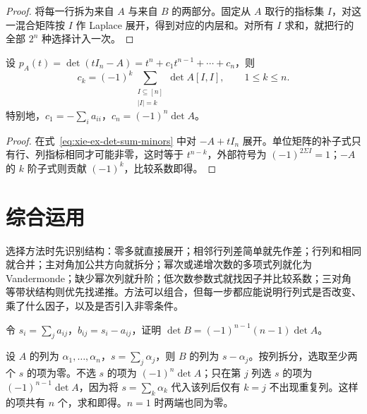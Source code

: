 \begin{proof}
将每一行拆为来自 $A$ 与来自 $B$ 的两部分。固定从 $A$ 取行的指标集 $I$，对这一混合矩阵按 $I$ 作 Laplace 展开，得到对应的内层和。对所有 $I$ 求和，就把行的全部 $2^n$ 种选择计入一次。
\end{proof}

\begin{corollary}[特征多项式的系数]
\label{cor:xie-ex-det-characteristic-coefficients}
设 $p_A(t)=\det(tI_n-A)=t^n+c_1t^{n-1}+\cdots+c_n$，则
\begin{equation}
\label{eq:xie-ex-det-characteristic-coefficients}
c_k=(-1)^k\sum_{\substack{I\subseteq[n]\\|I|=k}}\det A[I,I],
\qquad 1\leq k\leq n.
\end{equation}
特别地，$c_1=-\sum_i a_{ii}$，$c_n=(-1)^n\det A$。
\end{corollary}

\begin{proof}
在式~\eqref{eq:xie-ex-det-sum-minors} 中对 $-A+tI_n$ 展开。单位矩阵的补子式只有行、列指标相同才可能非零，这时等于 $t^{n-k}$，外部符号为 $(-1)^{2\Sigma I}=1$；$-A$ 的 $k$ 阶子式则贡献 $(-1)^k$，比较系数即得。
\end{proof}

\section{综合运用}
\label{sec:xie-ex-det-synthesis}

选择方法时先识别结构：零多就直接展开；相邻行列差简单就先作差；行列和相同就合并；主对角加公共方向就拆分；幂次或递增次数的多项式列就化为 Vandermonde；缺少幂次列就升阶；低次数参数式就找因子并比较系数；三对角等带状结构则优先找递推。方法可以组合，但每一步都应能说明行列式是否改变、乘了什么因子，以及是否引入非零条件。

\begin{example}
\label{ex:xie-ex-det-row-complements}
令 $s_i=\sum_j a_{ij}$，$b_{ij}=s_i-a_{ij}$，证明 $\det B=(-1)^{n-1}(n-1)\det A$。
\end{example}

\begin{solve}
设 $A$ 的列为 $\alpha_1,\ldots,\alpha_n$，$s=\sum_j\alpha_j$，则 $B$ 的列为 $s-\alpha_j$。按列拆分，选取至少两个 $s$ 的项为零。不选 $s$ 的项为 $(-1)^n\det A$；只在第 $j$ 列选 $s$ 的项为 $(-1)^{n-1}\det A$，因为将 $s=\sum_k\alpha_k$ 代入该列后仅有 $k=j$ 不出现重复列。这样的项共有 $n$ 个，求和即得。$n=1$ 时两端也同为零。
\end{solve}

